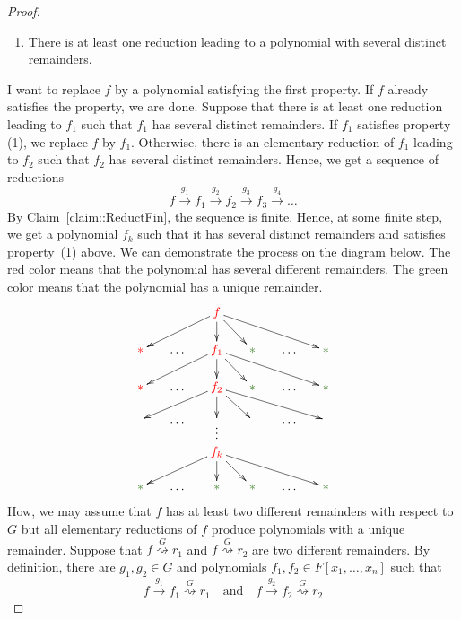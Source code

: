 \begin{proof}
\begin{enumerate}
\item There is at least one reduction leading to a polynomial with several distinct remainders.
\end{enumerate}
I want to replace $f$ by a polynomial satisfying the first property.
If $f$ already satisfies the property, we are done.
Suppose that there is at least one reduction leading to $f_1$ such that $f_1$ has several distinct remainders.
If $f_1$ satisfies property (1), we replace $f$ by $f_1$.
Otherwise, there is an elementary reduction of $f_1$ leading to $f_2$ such that $f_2$ has several distinct remainders.
Hence, we get a sequence of reductions
\[
f\stackrel{g_1}{\longrightarrow}f_1\stackrel{g_2}{\longrightarrow}f_2\stackrel{g_3}{\longrightarrow}f_3\stackrel{g_4}{\longrightarrow}\ldots
\]
By Claim~\ref{claim::ReductFin}, the sequence is finite.
Hence, at some finite step, we get a polynomial $f_k$ such that it has several distinct remainders and satisfies property~(1) above.
We can demonstrate the process on the diagram below.
The red color means that the polynomial has several different remainders.
The green color means that the polynomial has a unique remainder.
\[
\xymatrix@R=15pt@C=15pt{
	{}&{}&{\textcolor{red}{f}}\ar[dll]\ar[d]\ar[dr]\ar[drrr]&{}&{}&{}\\
	{\textcolor{red}{*}}&{\ldots}&{\textcolor{red}{f_1}}\ar[dll]\ar[d]\ar[dr]\ar[drrr]&{\textcolor{OliveGreen}{*}}&{\ldots}&{\textcolor{OliveGreen}{*}}\\
	{\textcolor{red}{*}}&{\ldots}&{\textcolor{red}{f_2}}\ar[dll]\ar[d]\ar[dr]\ar[drrr]&{\textcolor{OliveGreen}{*}}&{\ldots}&{\textcolor{OliveGreen}{*}}\\
	{}&{\ldots}&{}\ar@{}[d]|(.3){\vdots}&{}&{\ldots}&{}\\
	{}&{}&{\textcolor{red}{f_k}}\ar[dll]\ar[d]\ar[dr]\ar[drrr]&{}&{}&{}\\
	{\textcolor{OliveGreen}{*}}&{\ldots}&{\textcolor{OliveGreen}{*}}&{\textcolor{OliveGreen}{*}}&{\ldots}&{\textcolor{OliveGreen}{*}}\\
}
\]
How, we may assume that $f$ has at least two different remainders with respect to $G$ but all elementary reductions of $f$ produce polynomials with a unique remainder.
Suppose that $f  \stackrel{G}{\rightsquigarrow}  r_1$ and $f  \stackrel{G}{\rightsquigarrow}  r_2$ are two different remainders.
By definition, there are $g_1, g_2\in G$ and polynomials $f_1, f_2\in F[x_1,\ldots,x_n]$ such that 
\[
f  \stackrel{g_1}{\longrightarrow}f_1  \stackrel{G}{\rightsquigarrow} r_1
\quad\text{and}\quad
f  \stackrel{g_2}{\longrightarrow}f_2  \stackrel{G}{\rightsquigarrow} r_2
\]
\end{proof}
